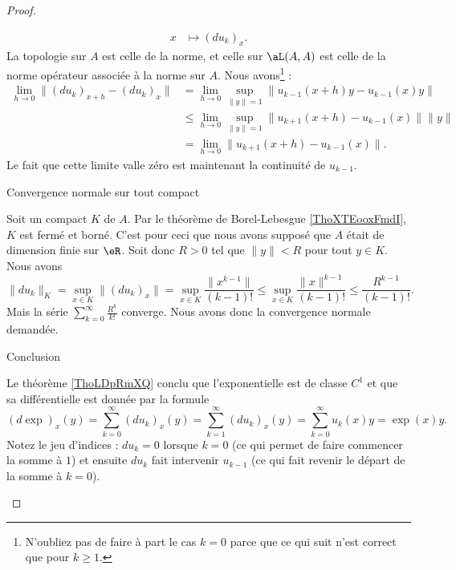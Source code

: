 \begin{proof}
\begin{subproof}
\begin{equation}
\begin{aligned}
                    x&\mapsto (du_k)_x. 
                \end{aligned}
            \end{equation}
            La topologie sur \( A\) est celle de la norme, et celle sur \( \aL(A,A)\) est celle de la norme opérateur associée à la norme sur $A$. Nous avons\footnote{N'oubliez pas de faire à part le cas \( k=0\) parce que ce qui suit n'est correct que pour \( k\geq 1\).} :
            \begin{subequations}
                \begin{align}
                    \lim_{h\to 0} \| (du_k)_{x+h}-(du_k)_x \|&=\lim_{h\to 0} \sup_{\| y \|=1}\| u_{k-1}(x+h)y-u_{k-1}(x)y \|\\
                    &\leq\lim_{h\to 0} \sup_{\| y \|=1}\| u_{k+1}(x+h)-u_{k-1}(x) \|\| y \|\\
                    &=\lim_{h\to 0} \| u_{k+1}(x+h)-u_{k-1}(x) \|.
                \end{align}
            \end{subequations}
            Le fait que cette limite valle zéro est maintenant la continuité de \( u_{k-1}\).

        \item[Convergence normale sur tout compact]

            Soit un compact \( K\) de \( A\). Par le théorème de Borel-Lebesgue \ref{ThoXTEooxFmdI}, \( K\) est fermé et borné. C'est pour ceci que nous avons supposé que \( A\) était de dimension finie sur \( \eR\). Soit donc \( R>0\) tel que \( \| y \|<R\) pour tout \( y\in K\). Nous avons
            \begin{equation}
                \| du_k \|_K=\sup_{x\in K}\| (du_k)_x \|=\sup_{x\in K}\frac{ \| x^{k-1} \| }{ (k-1)! }\leq \sup_{x\in K}\frac{ \| x \|^{k-1} }{ (k-1)! }\leq \frac{ R^{k-1} }{ (k-1)! }.
            \end{equation}
            Mais la série \( \sum_{k=0}^{\infty}\frac{ R^k }{k!}\) converge. Nous avons donc la convergence normale demandée.

        \item[Conclusion]

            Le théorème \ref{ThoLDpRmXQ} conclu que l'exponentielle est de classe \( C^1\) et que sa différentielle est donnée par la formule
            \begin{equation}
                (d\exp)_x(y)=\sum_{k=0}^{\infty}(du_k)_x(y)=\sum_{k=1}^{\infty}(du_k)_x(y)=\sum_{k=0}^{\infty}u_k(x)y=\exp(x)y.
            \end{equation}
            Notez le jeu d'indices : \( du_k=0\) lorsque \( k=0\) (ce qui permet de faire commencer la somme à \( 1\)) et ensuite \( du_k\) fait intervenir \( u_{k-1}\) (ce qui fait revenir le départ de la somme à \( k=0\)).

    \end{subproof}
\end{proof}

